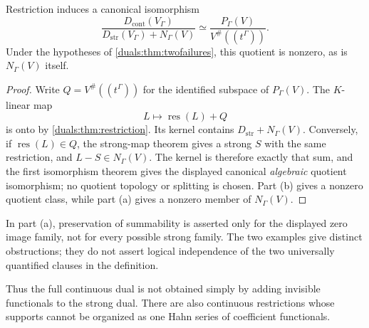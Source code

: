 \documentclass[11pt,letterpaper]{article}
\numberwithin{equation}{section}
\theoremstyle{definition}
\theoremstyle{remark}
\newcommand{\res}{\operatorname{res}}
\newcommand{\Dstr}{D_{\mathrm{str}}}
\newcommand{\Dcont}{D_{\mathrm{cont}}}
\begin{document}
\begin{corollary}\label{duals:cor:second-quotient}
Restriction induces a canonical isomorphism
\begin{equation}\label{duals:eq:second-quotient}
 \frac{\Dcont(V_\Gamma)}{\Dstr(V_\Gamma)+N_\Gamma(V)}
 \simeq
 \frac{P_\Gamma(V)}{V^\#((t^\Gamma))}.
\end{equation}
Under the hypotheses of \cref{duals:thm:twofailures}, this quotient is
nonzero, as is $N_\Gamma(V)$ itself.
\end{corollary}
\begin{proof}
Write $Q=V^\#((t^\Gamma))$ for the identified subspace of
$P_\Gamma(V)$. The $K$-linear map
\[
 L\longmapsto \res(L)+Q
\]
is onto by \cref{duals:thm:restriction}. Its kernel contains
$\Dstr+N_\Gamma(V)$. Conversely, if $\res(L)\in Q$, the strong-map
theorem gives a strong $S$ with the same restriction, and
$L-S\in N_\Gamma(V)$. The kernel is therefore exactly that sum,
and the first isomorphism theorem gives the displayed canonical
\emph{algebraic} quotient isomorphism; no quotient topology or splitting
is chosen. Part (b) gives a nonzero quotient class, while part (a)
gives a nonzero member of $N_\Gamma(V)$.
\end{proof}

In part (a), preservation of summability is asserted only for the
displayed zero image family, not for every possible strong family.
The two examples give distinct obstructions; they do not assert logical
independence of the two universally quantified clauses in the definition.

Thus the full continuous dual is not obtained simply by adding
invisible functionals to the strong dual. There are also continuous
restrictions whose supports cannot be organized as one Hahn series of
coefficient functionals.
\end{document}
